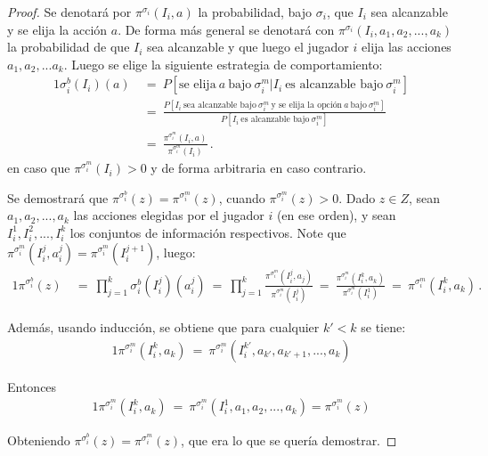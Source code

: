 \begin{proof}
Se denotará por $\pi^{\sigma_i}(I_i, a)$ la probabilidad, bajo $\sigma_i$, que $I_i$ sea alcanzable y se elija la acción $a$. De forma más general se denotará con $\pi^{\sigma_i}(I_i, a_1, a_2, ..., a_k)$ la probabilidad de que $I_i$ sea alcanzable y que luego el jugador $i$ elija las acciones $a_1, a_2, ... a_k$. Luego se elige la siguiente estrategia de comportamiento:
\begin{alignat}{1}
\sigma_i^b(I_i)(a)\ &=\ P[\text{se elija}\ a\ \text{bajo}\ \sigma^m_i | I_i\ \text{es alcanzable bajo}\ \sigma^m_i] \\
&=\ \frac{P[I_i\ \text{sea alcanzable bajo}\ \sigma^m_i\ \text{y se elija la opción}\ a\ \text{bajo}\ \sigma^m_i]}{ P[I_i\ \text{es alcanzable bajo}\ \sigma^m_i] } \\
&=\ \frac{\pi^{\sigma^m_i}(I_i, a)}{\pi^{\sigma^m_i}(I_i)} \label{eq:mixta-a-comportamiento} \,.
\end{alignat}
en caso que $\pi^{\sigma^m_i}(I_i) > 0$ y de forma arbitraria en caso contrario.

Se demostrará que $\pi^{\sigma^b_i}(z) = \pi^{\sigma^m_i}(z)$, cuando $\pi^{\sigma^m_i}(z) > 0$.  Dado $z \in Z $, sean $a_1, a_2, ..., a_k$ las acciones elegidas por el jugador $i$ (en ese orden), y sean $I^1_i, I^2_i, ..., I^k_i$ los conjuntos de información respectivos. Note que $\pi^{\sigma^m_i}(I^j_i, a^j_i) = \pi^{\sigma^m_i}(I^{j+1}_i)$, luego:
\begin{alignat}{1}
\pi^{\sigma^b_i}(z)\ &=\ \prod_{j = 1}^k \sigma^b_i(I^j_i)(a^j_i)\ =\ \prod _{j = 1}^k \frac{\pi^{\sigma^m_i}(I^j_i, a_j)}{\pi^{\sigma^m_i}(I^j_i)}\ =\ \frac{\pi^{\sigma^m_i}(I^k_i, a_k)}{\pi^{\sigma^m_i}(I^1_i)}\ =\ \pi^{\sigma^m_i}(I^k_i, a_k) \,.
\end{alignat}

Además, usando inducción, se obtiene que para cualquier $k' < k$ se tiene:
\begin{alignat}{1}
\pi^{\sigma^m_i}(I^k_i, a_k)\ =\ \pi^{\sigma^m_i} (I^{k'}_i, a_{k'}, a_{k'+1}, ..., a_{k})
\end{alignat}

Entonces
\begin{alignat}{1}
\pi^{\sigma^m_i}(I^k_i, a_k)\ =\ \pi^{\sigma^m_i}(I^1_i, a_1, a_2, ..., a_k) = \pi^{\sigma^m_i}(z)
\end{alignat}

Obteniendo $\pi^{\sigma^b_i}(z) = \pi^{\sigma^m_i}(z)$, que era lo que se quería demostrar.
\end{proof}


